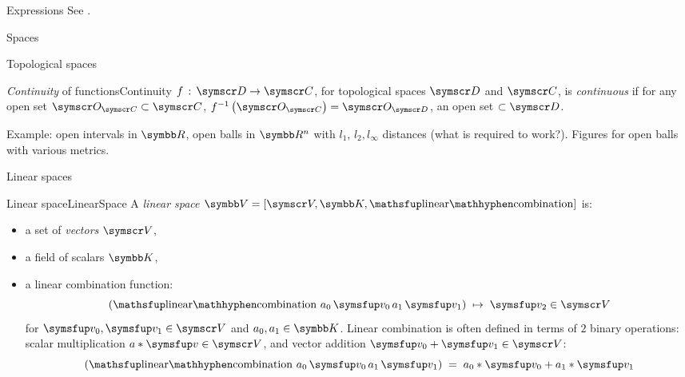 \documentclass[12pt]{PalisadesLakesArticle}
\begin{document}
\begin{plSection}{Expressions}
See 
.

\begin{plSection}{Spaces}
\begin{plSection}{Topological spaces}
\label{sec:Topological-spaces}

\begin{plDefinition}{\textsl{Continuity} of functions}{Continuity} 
$f \, : \, \Set{D} \rightarrow \Set{C}$,
for topological spaces $\Set{D}$ and $\Set{C}$,
is \textit{continuous}
if for any open set $\Set{O}_{\Set{C}} \subset \Set{C}$,
$f^{-1}\left( \Set{O}_{\Set{C}} \right) = 
\Set{O}_{\Set{D}}$, an open set $\subset \Set{D}$.

Example: open intervals in $\Space{R}$,
open balls in $\Space{R}^n$ with $l_1$, $l_2, l_{\infty}$ distances
(what is required to work?).
Figures for open balls with various metrics.
\end{plDefinition}%

\end{plSection}%
\begin{plSection}{Linear spaces}
\label{sec:Linear-spaces}

\begin{plDefinition}{Linear space}{LinearSpace}
A \textit{linear space} 
$\Space{V} = \left[ \Set{V}, \Space{K}, \linearCombination \right]$
 is:
\begin{itemize}
  \item a set of \textit{vectors} $\Set{V}$,
  \item a field  of scalars $\Space{K}$,
  \item a linear combination function: 
\begin{equation}
\left( \linearCombination 
\, a_0 \, \Vector{v}_0 \, a_1 \, \Vector{v}_1 \right) \; 
 \mapsto \; \Vector{v}_2  \in \Set{V}
\end{equation}
for $\Vector{v}_0, \Vector{v}_1 \in \Set{V} $
and $a_0, a_1 \in \Space{K}$.
Linear combination is often defined in terms of
$2$ binary operations:
scalar multiplication $a * \Vector{v} \in \Set{V}$,
and vector addition $\Vector{v}_0 + \Vector{v}_1 \in \Set{V}$:
\begin{equation}
\left( \linearCombination 
\, a_0 \, \Vector{v}_0 \, a_1 \, \Vector{v}_1 \right) \; 
= \; a_0*\Vector{v}_0 + a_1*\Vector{v}_1
\end{equation}
\end{itemize}
\end{plDefinition}


\end{plSection}
\end{plSection}
\end{plSection}
\end{document}
